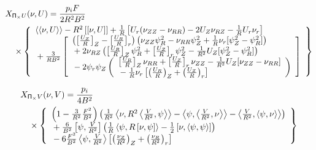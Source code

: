 \begin{eqnarray*}
  & \lefteqn{X_{\P_\times U}(\nu, U) = \frac{p_i F}{2 R^2 B^2}} &
  \\ && \mbox{} \times  
  \left\{ \begin{array}{l}
  \funcss{\nu}{U} - R^2 \funcaa{\nu}{U} 
  + \frac{1}{R} \left[ U_r (\nu_{Z Z} - \nu_{R R})
                     -2 U_Z \nu_{R Z} - \frac{1}{R} U_r \nu_r \right]
  \\ \mbox{}
  + \frac{3}{R B^2} \left[ \begin{array}{l}
    \left( \left[\frac{U_Z}{R} \right]_Z 
         - \left[\frac{U_R}{R} \right]_r \right)
    \left(\nu_{Z Z} \psi_R^2 - \nu_{R R} \psi_Z^2
         +\frac{1}{R} \nu_r [\psi_Z^2 - \psi_R^2] \right)
    \\ \mbox{}
    + 2\nu_{R Z} \left( 
        \left[ \frac{U_R}{R} \right]_Z \psi_R^2
      + \left[ \frac{U_Z}{R} \right]_r \psi_Z^2
      - \frac{1}{R^2} U_Z [\psi_Z^2 - \psi_R^2] \right)
    \\ \mbox{}
    - 2 \psi_r \psi_Z \left( \begin{array}{l}
        \left[ \frac{U_R}{R} \right]_Z \nu_{R R}
      + \left[ \frac{U_Z}{R} \right]_r \nu_{Z Z}
      - \frac{1}{R^2} U_Z [\nu_{Z Z} - \nu_{R R}] 
      \\ \mbox{}
      - \frac{1}{R} \nu_r \left[ 
	  \left( \frac{U_R}{R} \right)_Z
	+ \left( \frac{U_Z}{R} \right)_r \right] 
      \end{array} \right)
    \end{array} \right]
  \end{array} \right\}
\end{eqnarray*}

\begin{eqnarray*}
  & \lefteqn{X_{\P_\times V}(\nu, V) = \frac{p_i}{4 B^2}} &
  \\ && \mbox{} \times 
  \left\{ \begin{array}{l}
    \left(1 - \frac{3}{R^2} \frac{F^2}{B^2} \right) \left(
    \frac{1}{R^2} \ip{\nu}{R^2\ip{\frac{V}{R^2}}{\psi}}
    - \ip{\psi}{\ip{\frac{V}{R^2}}{\nu}}
    - \ip{\frac{V}{R^2}}{\ip{\psi}{\nu}} \right)
    \\ \mbox{} + \frac{6}{B^2} \pb{\psi}{\frac{V}{R^2}}
    \left(\frac{1}{R} \ip{\psi}{R \pb{\nu}{\psi}}
    - \frac{1}{2} \pb{\nu}{\ip{\psi}{\psi}} \right)
    \\ \mbox{} - 6 \frac{F^2}{B^2} \ip{\psi}{\frac{V}{R^2}}
    \left[ \left(\frac{\nu_Z}{R^2} \right)_Z
         + \left(\frac{\nu_R}{R^2} \right)_r \right]
  \end{array} \right\}
\end{eqnarray*}


